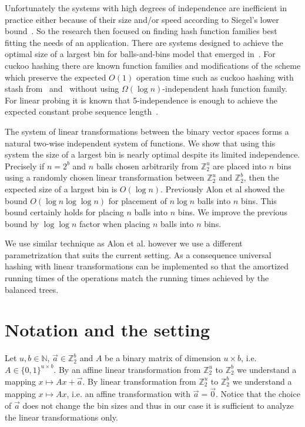 \documentclass[unicode,review]{siamart1116}
\newcommand{\vecspace}[2]{\mathbb{Z}_{#1}^{#2}}
\newcommand{\binvecspace}[1]{\vecspace{2}{#1}}
\numberwithin{theorem}{section}
\begin{document}
Unfortunately the systems with high degrees of independence are inefficient in practice either because of their size and/or speed according to Siegel's lower bound~\cite{siegel}. 
So the research then focused on finding hash function families best fitting the needs of an application. 
There are systems designed to achieve the optimal size of a largest bin for balls-and-bins model that emerged in~\cite{celisetal}.
For cuckoo hashing there are known function families and modifications of the scheme which preserve the expected $O(1)$ operation time such as cuckoo hashing with stash from~\cite{mitzenmacher-cuckoo} and~\cite{dietzfelbinger-cuckoo} without using $\Omega(\log n)$-independent hash function family.
For linear probing it is known that 5-independence is enough to achieve the expected constant probe sequence length~\cite{linear-probing}.

The system of linear transformations between the binary vector spaces forms a natural two-wise independent system of functions.
We show that using this system the size of a largest bin is nearly optimal despite its limited independence.
Precisely if $n = 2^b$ and $n$ balls chosen arbitrarily from $\binvecspace{u}$ are placed into $n$ bins using a randomly chosen linear transformation between $\binvecspace{u}$ and $\binvecspace{b}$, then the expected size of a largest bin is $O(\log n)$.
Previously Alon et al \cite{alonetal} showed the bound $O(\log n \log \log n)$ for placement of $n \log n$ balls into $n$ bins.
This bound certainly holds for placing $n$ balls into $n$ bins.
We improve the previous bound by $\log \log n$ factor when placing $n$ balls into $n$ bins.

We use similar technique as Alon et al. however we use a different parametrization that suits the current setting. As a consequence universal hashing with linear transformations can be implemented so that the amortized running times of the operations match the running times achieved by the balanced trees.

\section{Notation and the setting}
Let $u, b \in \mathbb{N}$, $\vec{a} \in \binvecspace{b}$ and $A$ be a binary matrix of dimension $u \times b$, i.e. $A \in \{0, 1\}^{u \times b}$.
By an affine linear transformation from $\binvecspace{u}$ to $\binvecspace{b}$ we understand a mapping $x \mapsto Ax + \vec{a}$.
By linear transformation from $\binvecspace{u}$ to $\binvecspace{b}$
we understand a mapping $x \mapsto Ax$, i.e. an affine transformation with $\vec{a} = \vec{0}$.
Notice that the choice of $\vec{a}$ does not change the bin sizes and thus in our case it is sufficient to analyze the linear transformations only.
\end{document}
